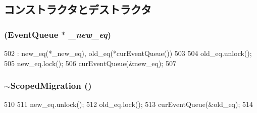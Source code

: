 \subsection{コンストラクタとデストラクタ}
\hypertarget{classEventQueue_1_1ScopedMigration_a278034a612e4c2bcdff92e4ddb95298c}{
\subsubsection[{ScopedMigration}]{ ({\bf EventQueue} $\ast$ {\em \_\-new\_\-eq})}}
\label{classEventQueue_1_1ScopedMigration_a278034a612e4c2bcdff92e4ddb95298c}



\begin{DoxyCode}
502             :  new_eq(*_new_eq), old_eq(*curEventQueue())
503         {
504             old_eq.unlock();
505             new_eq.lock();
506             curEventQueue(&new_eq);
507         }
\end{DoxyCode}
\hypertarget{classEventQueue_1_1ScopedMigration_a567f267a37582fed196677493d6eb9fc}{
\subsubsection[{$\sim$ScopedMigration}]{\setlength{\rightskip}{0pt plus 5cm}$\sim${\bf ScopedMigration} ()}}
\label{classEventQueue_1_1ScopedMigration_a567f267a37582fed196677493d6eb9fc}



\begin{DoxyCode}
510         {
511             new_eq.unlock();
512             old_eq.lock();
513             curEventQueue(&old_eq);
514         }
\end{DoxyCode}


